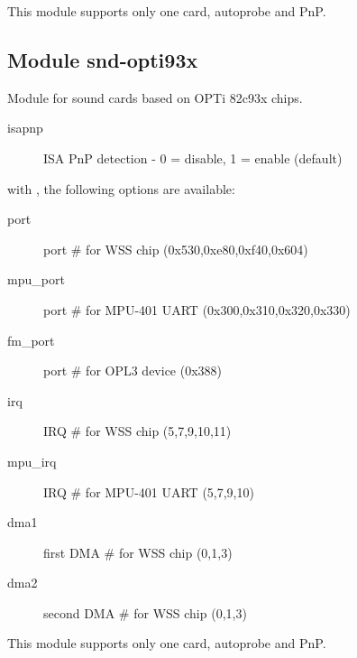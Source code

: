 \documentclass[a4paper,8pt,english]{sphinxmanual}
\begin{document}
This module supports only one card, autoprobe and PnP.


\subsection{Module snd-opti93x}
\label{sound/alsa-configuration:module-snd-opti93x}
Module for sound cards based on OPTi 82c93x chips.
\begin{description}
\item[{isapnp}] \leavevmode
ISA PnP detection - 0 = disable, 1 = enable (default)

\end{description}

with , the following options are available:
\begin{description}
\item[{port}] \leavevmode
port \# for WSS chip (0x530,0xe80,0xf40,0x604)

\item[{mpu\_port}] \leavevmode
port \# for MPU-401 UART (0x300,0x310,0x320,0x330)

\item[{fm\_port}] \leavevmode
port \# for OPL3 device (0x388)

\item[{irq}] \leavevmode
IRQ \# for WSS chip (5,7,9,10,11)

\item[{mpu\_irq}] \leavevmode
IRQ \# for MPU-401 UART (5,7,9,10)

\item[{dma1}] \leavevmode
first DMA \# for WSS chip (0,1,3)

\item[{dma2}] \leavevmode
second DMA \# for WSS chip (0,1,3)

\end{description}

This module supports only one card, autoprobe and PnP.
\end{document}
